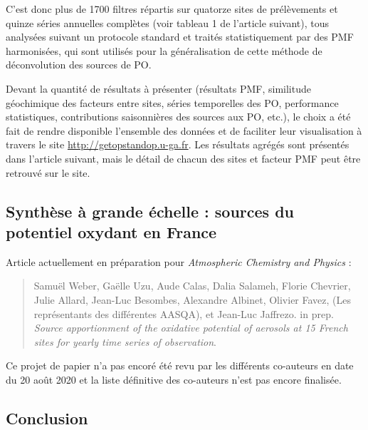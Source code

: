 C'est donc plus de 1700 filtres répartis sur quatorze sites de prélèvements et quinze séries
annuelles complètes (voir tableau 1 de l'article suivant), tous analysées suivant
un protocole standard et traités statistiquement par des PMF
harmonisées, qui sont utilisés pour la généralisation de cette méthode de déconvolution des
sources de PO.

\begin{tcolorbox}[colback=red!5!white,colframe=Melon,title=Note]
    Devant la quantité de résultats à présenter (résultats PMF, similitude géochimique des
    facteurs entre sites, séries temporelles des PO, performance statistiques,
    contributions saisonnières des sources aux PO, etc.), le choix a été fait de rendre
    disponible l'ensemble des données et de faciliter leur visualisation à travers le site
    \url{http://getopstandop.u-ga.fr}.
    Les résultats agrégés sont présentés dans l'article suivant, mais le détail de chacun
    des sites et facteur PMF peut être retrouvé sur le site.
\end{tcolorbox}

\subsection{Synthèse à grande échelle : sources du potentiel oxydant en France}%
\label{sub:article}

\begin{tcolorbox}[colback=red!5!white,colframe=Melon,title=Note]
Article actuellement en préparation pour \textit{Atmospheric Chemistry and Physics} :
\begin{quote}
    Samuël Weber, Gaëlle Uzu, Aude Calas, Dalia Salameh, Florie Chevrier, Julie Allard,
    Jean-Luc Besombes, Alexandre Albinet, Olivier Favez, (Les représentants des différentes AASQA), et
    Jean-Luc Jaffrezo. in prep.
    \textit{Source apportionment of the oxidative potential of aerosols at 15 French
    sites for yearly time series of observation}.
\end{quote}
Ce projet de papier n'a pas encoré été revu par les différents co-auteurs en date du 20
août 2020 et la liste définitive des co-auteurs n'est pas encore finalisée.
\end{tcolorbox}

\clearpage


\subsection{Conclusion}%
\label{sec:conclusion_synthèse_OP}

